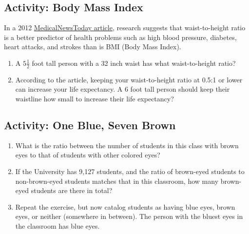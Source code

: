 \wbnewpage
\subsection{Activity: Body Mass Index}
In a 2012 \href{https://www.medicalnewstoday.com/articles/245328#1}{MedicalNewsToday article}, research suggests that waist-to-height ratio is a better predictor of health problems such as high blood pressure, diabetes, heart attacks, and strokes than is BMI (Body Mass Index).
\begin{enumerate}
\item A $5\frac12$ foot tall person with a 32 inch waist has what waist-to-height ratio?\wbvfill
\item According to the article, keeping your waist-to-height ratio at 0.5:1 or lower can increase your life expectancy. A 6 foot tall person should keep their waistline how small to increase their life expectancy?\wbvfill
\end{enumerate}

\wbnewpage
\subsection{Activity: One Blue, Seven Brown}
\begin{enumerate}
\item What is the ratio between the number of students in this class with brown eyes to that of students with other colored eyes?\wbvfill
\item If the University has 9,127 students, and the ratio of brown-eyed students to non-brown-eyed students matches that in this classroom, how many brown-eyed students are there in total? \wbvfill
\item Repeat the exercise, but now catalog students as having blue eyes, brown eyes, or neither (somewhere in between). The person with the bluest eyes in the classroom has blue eyes. \wbvfill\wbvfill
\end{enumerate}

\wbnewpage
